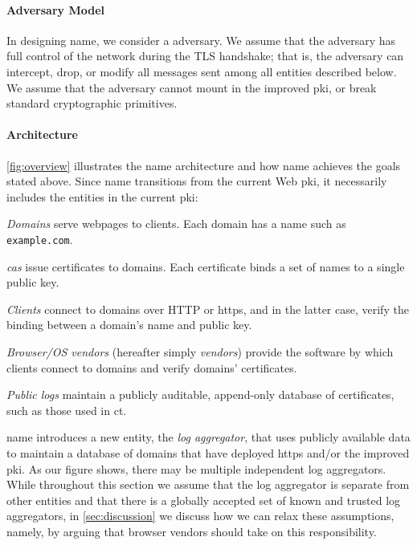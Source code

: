 \paragraph{Adversary Model}

In designing \ac{name}, we consider a  adversary. 
We assume that the adversary has full
control of the network during the TLS handshake; that is, the adversary can
intercept, drop, or modify all messages sent among all entities described
below. We assume that the adversary cannot mount  in the improved
\ac{pki}, or break standard cryptographic primitives.

\paragraph{Architecture}

\autoref{fig:overview} illustrates the \ac{name} architecture and how \ac{name}
achieves the goals stated above. Since \ac{name} transitions from the current
Web \ac{pki}, it necessarily includes the entities in the current \ac{pki}:
\begin{compactitem}
\item \emph{Domains} serve webpages to clients. Each domain has a name such as
  \texttt{example.com}.
\item \emph{\acp{ca}} issue certificates to domains. Each certificate binds a
  set of names to a single public key.
\item \emph{Clients} connect to domains over HTTP or \ac{https}, and in the
  latter case, verify the binding between a domain's name and public key.
\item \emph{Browser/OS vendors} (hereafter simply \emph{vendors}) provide the
  software by which clients connect to domains and verify domains' certificates.
\item \emph{Public logs} maintain a publicly auditable, append-only database of
  certificates, such as those used in \ac{ct}.
\end{compactitem}
\ac{name} introduces a new entity, the \emph{log aggregator}, that uses publicly
available data to maintain a database of domains that have deployed \ac{https}
and/or the improved \ac{pki}. As our figure shows, there may be multiple
independent log aggregators. While throughout this section we assume that the
log aggregator is separate from other entities and that there is a globally
accepted set of known and trusted log aggregators, in \autoref{sec:discussion}
we discuss how we can relax these assumptions, namely, by arguing that browser
vendors should take on this responsibility.

